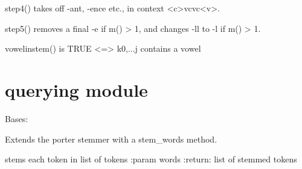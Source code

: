 \documentclass[letterpaper,10pt,english]{sphinxmanual}
\begin{document}
\begin{fulllineitems}
\begin{fulllineitems}
\end{fulllineitems}


\begin{fulllineitems}
\label{\detokenize{porter:porter.PorterStemmer.step4}}
step4() takes off -ant, -ence etc., in context \textless{}c\textgreater{}vcvc\textless{}v\textgreater{}.

\end{fulllineitems}


\begin{fulllineitems}
\label{\detokenize{porter:porter.PorterStemmer.step5}}
step5() removes a final -e if m() \textgreater{} 1, and changes -ll to -l if
m() \textgreater{} 1.

\end{fulllineitems}


\begin{fulllineitems}
\label{\detokenize{porter:porter.PorterStemmer.vowelinstem}}
vowelinstem() is TRUE \textless{}=\textgreater{} k0,...j contains a vowel

\end{fulllineitems}


\end{fulllineitems}



\chapter{querying module}
\label{\detokenize{querying::doc}}\label{\detokenize{querying:module-querying}}\label{\detokenize{querying:querying-module}}

\begin{fulllineitems}
\label{\detokenize{querying:querying.ExtendedPorterStemmer}}
Bases: 

Extends the porter stemmer with a stem\_words method.

\begin{fulllineitems}
\label{\detokenize{querying:querying.ExtendedPorterStemmer.stem_words}}
stems each token in list of tokens
:param words
:return: list of stemmed tokens

\end{fulllineitems}


\end{fulllineitems}
\end{document}
